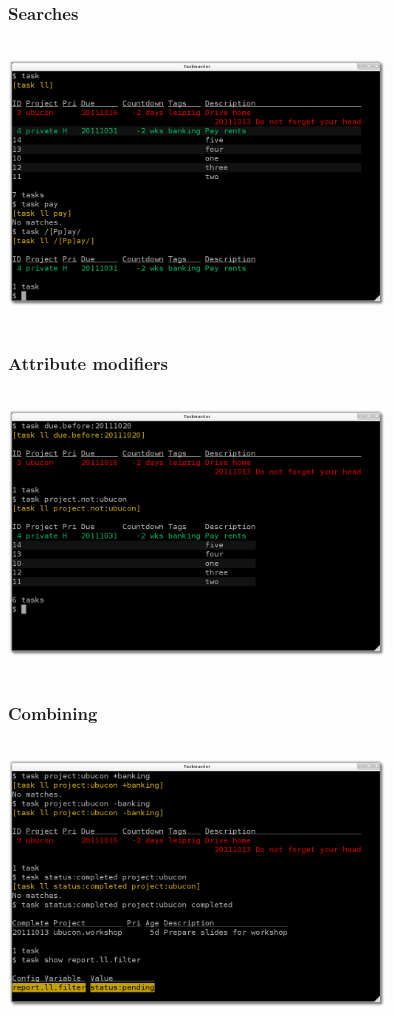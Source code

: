 \documentclass[t,handout]{beamer}
\begin{document}
\begin{frame}
\frametitle{Searches}
\begin{center}
\includegraphics[width=10cm,height=7.5cm]{filter_searches.png}
\end{center}
\end{frame}

\begin{frame}
\frametitle{Attribute modifiers}
\begin{center}
\includegraphics[width=10cm,height=7.5cm]{filter_attribute_modifiers.png}
\end{center}
\end{frame}

\begin{frame}
\frametitle{Combining}
\begin{center}
\includegraphics[width=10cm,height=7.5cm]{filter_combining.png}
\end{center}
\end{frame}
\end{document}
